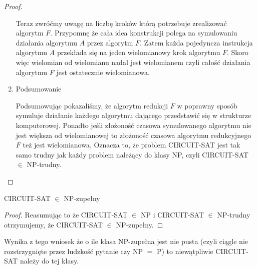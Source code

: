 \begin{proof}
\begin{enumerate}
Teraz zwróćmy uwagę na liczbę kroków którą potrzebuje zrealizować algorytm $F$. Przypomnę że cała idea konstrukcji polega na symulowaniu działania algorytmu $A$ przez algorytm $F$. Zatem każda pojedyncza instrukcja algorytmu $A$ przekłada się na jeden wielomianowy krok algorytmu $F$. Skoro więc wielomian od wielomianu nadal jest wielomianem czyli całość działania algorytmu $F$ jest ostatecznie wielomianowa.
	
\item Podsumowanie

Podsumowując pokazaliśmy, że algorytm redukcji $F$ w poprawny sposób symuluje działanie każdego algorytmu dającego przedstawić się w strukturze komputerowej. Ponadto jeśli złożoność czasowa symulowanego algorytmu nie jest większa od wielomianowej to złożoność czasowa algorytmu redukcyjnego $F$ też jest wielomianowa. Oznacza to, że problem CIRCUIT-SAT jest tak samo trudny jak każdy problem należący do klasy NP, czyli CIRCUIT-SAT $\in$ NP-trudny.
\end{enumerate}
\end{proof}

\begin{twr}
	CIRCUIT-SAT $\in$ NP-zupełny
\end{twr}

\begin{proof}
Reasumując to że CIRCUIT-SAT $\in$ NP i CIRCUIT-SAT $\in$ NP-trudny otrzymujemy, że CIRCUIT-SAT $\in$ NP-zupełny.
\end{proof}


Wynika z tego wniosek że o ile klasa NP-zupełna jest nie pusta (czyli ciągle nie rozstrzygnięte przez ludzkość pytanie czy NP $=$ P) to niewątpliwie CIRCUIT-SAT należy do tej klasy.

